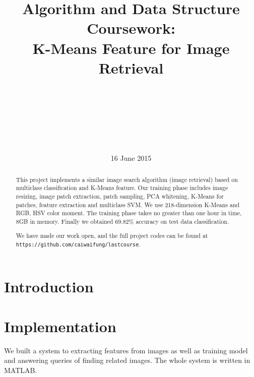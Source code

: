 \documentclass{acm_proc_article-sp}
\begin{document}
\title{Algorithm and Data Structure Coursework: \\K-Means Feature for
Image Retrieval}
\subtitle{}
%
%
\author{\\
       \\
       \\
   \\
       \\
       \\
}
\date{16 June 2015}

\maketitle
\begin{abstract}
        This project implements a similar image search algorithm (image
        retrieval) based on multiclass classification and K-Means feature. Our
        training phase includes image resizing, image patch extraction, patch
        sampling, PCA whitening, K-Means for patches, feature extraction and
        multiclass SVM\@. We use 218-dimension K-Means and RGB, HSV color moment.
        The training phase takes no greater than one hour in time, 8GB in memory.
        Finally we obtained 69.82\% accuracy on test data classification.

We have made our work open, and the full project codes can be found at
\texttt{https://github.com/caiwaifung/lastcourse}.
\end{abstract}


\section{Introduction}

\section{Implementation}
We built a system to extracting features from images as well as
    training model and answering queries of finding related images.
The whole system is written in MATLAB\@.
\end{document}
